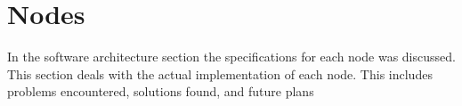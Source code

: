 \part{Nodes}

In the software architecture section the specifications for each node
was discussed.  This section deals with the actual implementation of
each node.  This includes problems encountered, solutions found, and
future plans




















